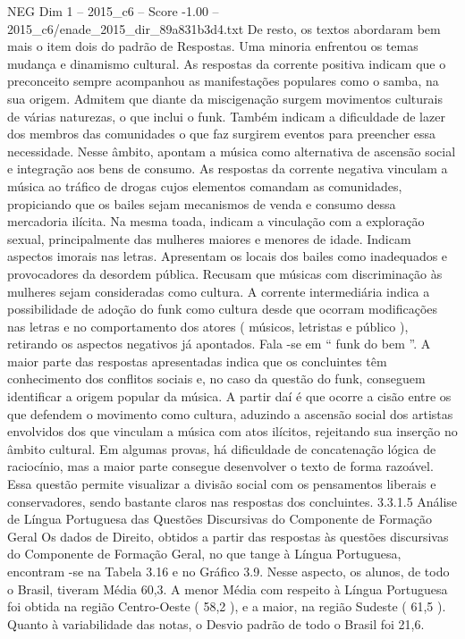 \begin{textsample}{NEG Dim 1 – 2015\_c6 – Score -1.00 – 2015\_c6/enade\_2015\_dir\_89a831b3d4.txt}
De resto, os textos abordaram bem mais o item dois do padrão de Respostas.
Uma minoria enfrentou os temas mudança e dinamismo cultural.
As respostas da corrente positiva indicam que o preconceito sempre acompanhou as manifestações populares como o samba, na sua origem.
Admitem que diante da miscigenação surgem movimentos culturais de várias naturezas, o que inclui o funk.
Também indicam a dificuldade de lazer dos membros das comunidades o que faz surgirem eventos para preencher essa necessidade.
Nesse âmbito, apontam a música como alternativa de ascensão social e integração aos bens de consumo.
As respostas da corrente negativa vinculam a música ao tráfico de drogas cujos elementos comandam as comunidades, propiciando que os bailes sejam mecanismos de venda e consumo dessa mercadoria ilícita.
Na mesma toada, indicam a vinculação com a exploração sexual, principalmente das mulheres maiores e menores de idade.
Indicam aspectos imorais nas letras.
Apresentam os locais dos bailes como inadequados e provocadores da desordem pública.
Recusam que músicas com discriminação às mulheres sejam consideradas como cultura.
A corrente intermediária indica a possibilidade de adoção do funk como cultura desde que ocorram modificações nas letras e no comportamento dos atores ( músicos, letristas e público ), retirando os aspectos negativos já apontados.
Fala -se em “ funk do bem ”.
A maior parte das respostas apresentadas indica que os concluintes têm conhecimento dos conflitos sociais e, no caso da questão do funk, conseguem identificar a origem popular da música.
A partir daí é que ocorre a cisão entre os que defendem o movimento como cultura, aduzindo a ascensão social dos artistas envolvidos dos que vinculam a música com atos ilícitos, rejeitando sua inserção no âmbito cultural.
Em algumas provas, há dificuldade de concatenação lógica de raciocínio, mas a maior parte consegue desenvolver o texto de forma razoável.
Essa questão permite visualizar a divisão social com os pensamentos liberais e conservadores, sendo bastante claros nas respostas dos concluintes. 3.3.1.5 Análise de Língua Portuguesa das Questões Discursivas do Componente de Formação Geral Os dados de Direito, obtidos a partir das respostas às questões discursivas do Componente de Formação Geral, no que tange à Língua Portuguesa, encontram -se na Tabela 3.16 e no Gráfico 3.9.
Nesse aspecto, os alunos, de todo o Brasil, tiveram Média 60,3.
A menor Média com respeito à Língua Portuguesa foi obtida na região Centro-Oeste ( 58,2 ), e a maior, na região Sudeste ( 61,5 ).
Quanto à variabilidade das notas, o Desvio padrão de todo o Brasil foi 21,6.

\end{textsample}
